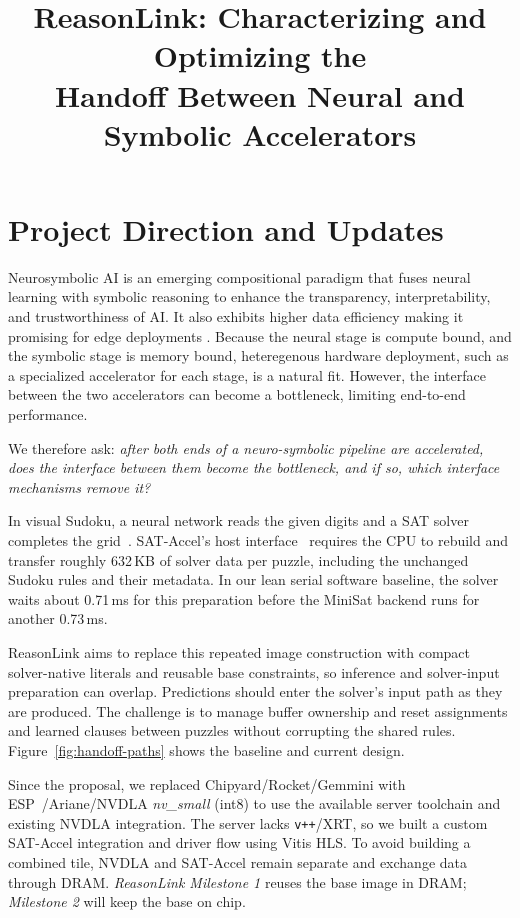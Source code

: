 \documentclass[conference,10pt,letterpaper]{IEEEtran}
\title{ReasonLink: Characterizing and Optimizing the\\Handoff Between Neural and Symbolic Accelerators}
\author{\IEEEauthorblockN{Vayun Gupta (vg2684), Aaron Mano Cherian (amc2535)}
\IEEEauthorblockA{COMS 6998: AI-Native Computing $\mid$ Fall 2026\\
P1: Exploration \& Progress $\mid$ Due October 26, 2026, 11:59 PM ET}}
\begin{document}
\maketitle
\thispagestyle{plain}
\pagestyle{plain}

\section{Project Direction and Updates}
Neurosymbolic AI is an emerging compositional paradigm that fuses neural learning with symbolic reasoning to enhance the transparency, interpretability, and trustworthiness of
AI. It also exhibits higher data efficiency making it promising for edge deployments \cite{cogsys}. Because the neural stage is compute bound, and the symbolic stage is memory bound, heteregenous hardware deployment, such as a specialized accelerator for each stage, is a natural fit. 
However, the interface between the two accelerators can become a bottleneck, limiting end-to-end performance. 

We therefore ask: \emph{after both ends of a neuro-symbolic pipeline are accelerated, does the interface between them become the bottleneck, and if so, which interface mechanisms remove it?} 

In visual Sudoku, a neural network reads the given digits and a SAT solver completes the grid~\cite{satnet}. SAT-Accel's host interface~\cite{sataccel} requires the CPU to rebuild and transfer roughly 632\,KB of solver data per puzzle, including the unchanged Sudoku rules and their metadata. In our lean serial software baseline, the solver waits about 0.71\,ms for this preparation before the MiniSat backend runs for another 0.73\,ms.

ReasonLink aims to replace this repeated image construction with compact solver-native literals and reusable base constraints, so inference and solver-input preparation can overlap. Predictions should enter the solver's input path as they are produced. The challenge is to manage buffer ownership and reset assignments and learned clauses between puzzles without corrupting the shared rules. Figure~\ref{fig:handoff-paths} shows the baseline and current design.

Since the proposal, we replaced Chipyard/Rocket/Gemmini with ESP~\cite{esp}/Ariane/NVDLA \emph{nv\_small} (int8) to use the available server toolchain and existing NVDLA integration. The server lacks \texttt{v++}/XRT, so we built a custom SAT-Accel integration and driver flow using Vitis HLS. To avoid building a combined tile, NVDLA and SAT-Accel remain separate and exchange data through DRAM. \emph{ReasonLink Milestone 1} reuses the base image in DRAM; \emph{Milestone 2} will keep the base on chip.
\end{document}
